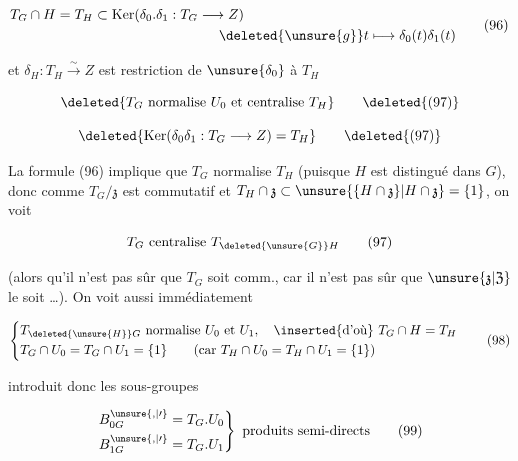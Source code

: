 \[\begin{aligned}
T_G\cap H=T_H&\subset\operatorname{Ker}(\delta_0.\delta_1:T_G\longrightarrow Z)\\
&\hspace{9em}\deleted{\unsure{g}}t\longmapsto\delta_0(t)\delta_1(t)
\end{aligned}\tag*{(96)}\]

et  $\delta_H:T_H\xrightarrow{\sim}Z$ est  restriction de $\unsure{\delta_0}$ à $T_H$


\[\deleted{T_G\ \text{normalise }U_0\text{ et centralise }T_H}\tag*{\deleted{(97)}}\]

\[\deleted{\operatorname{Ker}(\delta_0\delta_1:T_G\longrightarrow Z)=T_H}\tag*{\deleted{(97)}}\]


La formule (96) implique que $T_G$ normalise $T_H$ (puisque $H$ est distingué dans $G$), donc comme $T_G/\mathfrak{z}$ est commutatif et $T_H\cap\mathfrak{z}\subset\unsure{\{H\cap\mathfrak{z}\}|H\cap\mathfrak{z}}=\{1\}$, on voit

\[T_G\text{ centralise }T_{\deleted{\unsure{G}}H}\tag*{(97)}\]



(alors qu'il n'est pas sûr que  $T_G$ soit comm., car il n'est pas sûr que $\unsure{\mathfrak{z}|\mathfrak{Z}}$ le soit \ldots). On voit aussi immédiatement

\[\left\{\begin{aligned}
&T_{\deleted{\unsure{H}}G}\text{ normalise }U_0\text{ et }U_1,\quad \inserted{\text{d'où}}\ T_G\cap H=T_H\\
&T_G\cap U_0=T_G\cap U_1=\{1\}\qquad(\text{car }T_H\cap U_0=T_H\cap U_1=\{1\})
\end{aligned}\right.\tag*{(98)}\]

 introduit donc les sous-groupes

\[\left.\begin{aligned}
B_{0G}^{\unsure{,|\prime}}&=T_G.U_0\\
B_{1G}^{\unsure{,|\prime}}&=T_G.U_1
\end{aligned}\right\}\text{ produits semi-directs}\tag*{(99)}\]


